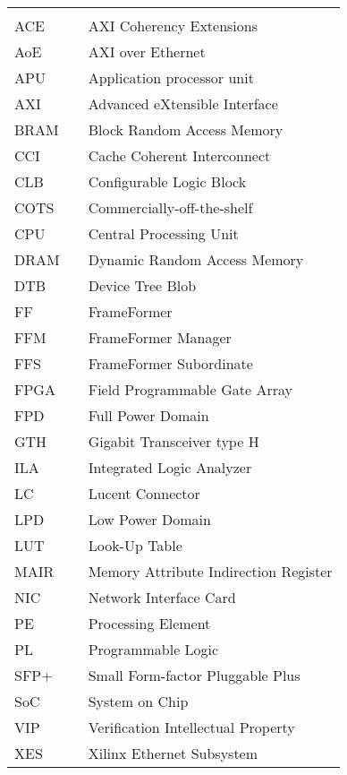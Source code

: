 \begin{center}
  \begin{tabular}{lll}
    \hspace*{2em} & \hspace*{1in} & \hspace*{4.5in} \\
    ACE & \dotfill & AXI Coherency Extensions \\
    AoE & \dotfill & AXI over Ethernet \\
    APU & \dotfill & Application processor unit \\
    AXI & \dotfill & Advanced eXtensible Interface \\
    BRAM & \dotfill & Block Random Access Memory \\
    CCI & \dotfill & Cache Coherent Interconnect \\
    CLB & \dotfill & Configurable Logic Block \\
    COTS & \dotfill & Commercially-off-the-shelf \\
    CPU & \dotfill & Central Processing Unit \\
    DRAM & \dotfill & Dynamic Random Access Memory \\
    DTB & \dotfill & Device Tree Blob \\
    FF & \dotfill &  FrameFormer \\
    FFM & \dotfill & FrameFormer Manager \\
    FFS & \dotfill & FrameFormer Subordinate \\
    FPGA & \dotfill & Field Programmable Gate Array \\
    FPD & \dotfill & Full Power Domain \\
    GTH & \dotfill & Gigabit Transceiver type H \\
    ILA & \dotfill & Integrated Logic Analyzer \\
    LC & \dotfill & Lucent Connector \\
    LPD & \dotfill & Low Power Domain \\
    LUT & \dotfill & Look-Up Table \\
    MAIR & \dotfill & Memory Attribute Indirection Register \\
    NIC & \dotfill & Network Interface Card \\
    PE & \dotfill & Processing Element \\
    PL & \dotfill & Programmable Logic \\
    SFP+ & \dotfill & Small Form-factor Pluggable Plus \\
    SoC & \dotfill & System on Chip \\
    VIP & \dotfill & Verification Intellectual Property \\
    XES & \dotfill & Xilinx Ethernet Subsystem \\
  \end{tabular}
\end{center}
\cleardoublepage


\newpage
\endofprelim
